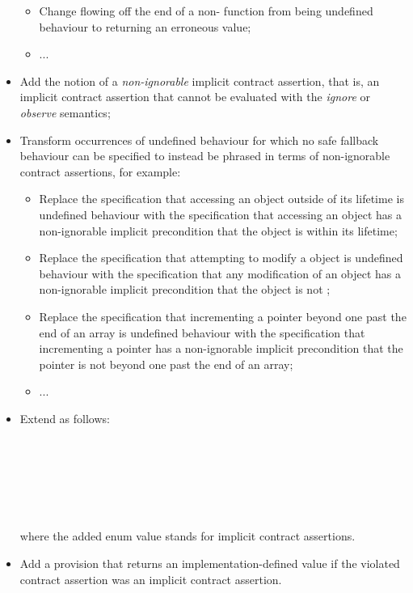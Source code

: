 \begin{itemize}
\begin{itemize}
\item Change flowing off the end of a non- function from being undefined behaviour to returning an erroneous value;
\item ...
\end{itemize}
\item Add the notion of a \emph{non-ignorable} implicit contract assertion, that is, an implicit contract assertion that cannot be evaluated with the \emph{ignore} or \emph{observe} semantics;
\item Transform occurrences of undefined behaviour for which no safe fallback behaviour can be specified to instead be phrased in terms of non-ignorable contract assertions, for example:
\begin{itemize}
\item Replace the specification that accessing an object outside of its lifetime is undefined behaviour with the specification that accessing an object has a non-ignorable implicit precondition that the object is within its lifetime;
\item Replace the specification that attempting to modify a  object is undefined behaviour with the specification that any modification of an object has a non-ignorable implicit precondition that the object is not ;
\item Replace the specification that incrementing a pointer beyond one past the end of an array is undefined behaviour with the specification that incrementing a pointer has a non-ignorable implicit precondition that the pointer is not beyond one past the end of an array; 
\item ...
\end{itemize}
\item Extend  as follows:

\phantom{~~} \\
\phantom{~~~~} \\
\phantom{~~~~} \\
\phantom{~~~~} \\ 
\phantom{~~~~} \\
\phantom{~~}\tcode{\};}

where the added enum value stands for implicit contract assertions.

\item Add a provision that  returns an implementation-defined value if the violated contract assertion was an implicit contract assertion.
\end{itemize}

